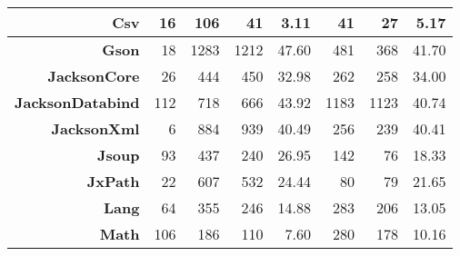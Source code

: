 \begin{table*}[]
{\begin{tabular}{|r|r|rrr|rrr|}
            \textbf{Csv}                            & 16                                     & \multicolumn{1}{r|}{106}  & \multicolumn{1}{r|}{41}   & 3.11                  & \multicolumn{1}{r|}{41}   & \multicolumn{1}{r|}{27}   & 5.17                  \\ \hline
            \textbf{Gson}                           & 18                                     & \multicolumn{1}{r|}{1283} & \multicolumn{1}{r|}{1212} & 47.60                 & \multicolumn{1}{r|}{481}  & \multicolumn{1}{r|}{368}  & 41.70                 \\ \hline
            \textbf{JacksonCore}                    & 26                                     & \multicolumn{1}{r|}{444}  & \multicolumn{1}{r|}{450}  & 32.98                 & \multicolumn{1}{r|}{262}  & \multicolumn{1}{r|}{258}  & 34.00                 \\ \hline
            \textbf{JacksonDatabind}                & 112                                    & \multicolumn{1}{r|}{718}  & \multicolumn{1}{r|}{666}  & 43.92                 & \multicolumn{1}{r|}{1183} & \multicolumn{1}{r|}{1123} & 40.74                 \\ \hline
            \textbf{JacksonXml}                     & 6                                      & \multicolumn{1}{r|}{884}  & \multicolumn{1}{r|}{939}  & 40.49                 & \multicolumn{1}{r|}{256}  & \multicolumn{1}{r|}{239}  & 40.41                 \\ \hline
            \textbf{Jsoup}                          & 93                                     & \multicolumn{1}{r|}{437}  & \multicolumn{1}{r|}{240}  & 26.95                 & \multicolumn{1}{r|}{142}  & \multicolumn{1}{r|}{76}   & 18.33                 \\ \hline
            \textbf{JxPath}                         & 22                                     & \multicolumn{1}{r|}{607}  & \multicolumn{1}{r|}{532}  & 24.44                 & \multicolumn{1}{r|}{80}   & \multicolumn{1}{r|}{79}   & 21.65                 \\ \hline
            \textbf{Lang}                           & 64                                     & \multicolumn{1}{r|}{355}  & \multicolumn{1}{r|}{246}  & 14.88                 & \multicolumn{1}{r|}{283}  & \multicolumn{1}{r|}{206}  & 13.05                 \\ \hline
            \textbf{Math}                           & 106                                    & \multicolumn{1}{r|}{186}  & \multicolumn{1}{r|}{110}  & 7.60                  & \multicolumn{1}{r|}{280}  & \multicolumn{1}{r|}{178}  & 10.16                 \\ \hline

\end{tabular}}
\end{table*}
